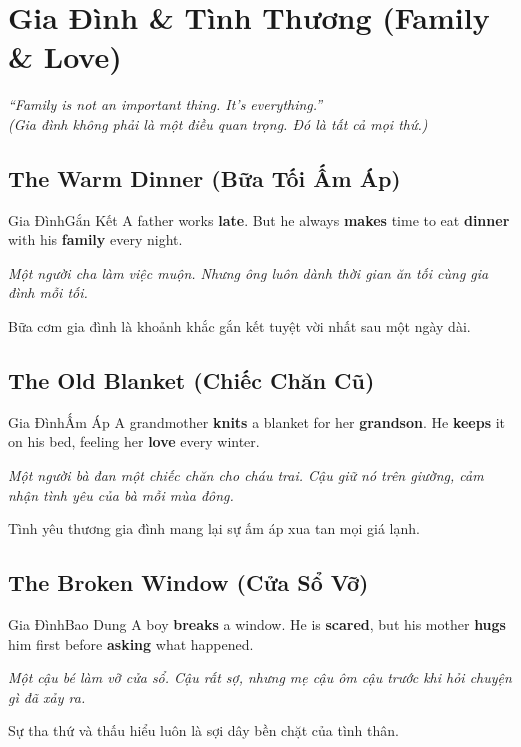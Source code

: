 \chapter{Gia Đình \& Tình Thương (Family \& Love)}

\begin{center}
  \textit{\color{truyenblue}``Family is not an important thing. It's everything.''}\\
  \textit{(Gia đình không phải là một điều quan trọng. Đó là tất cả mọi thứ.)}
\end{center}

\ngancach

\section{The Warm Dinner (Bữa Tối Ấm Áp)}
\begin{truyen}{Gia Đình}{Gắn Kết}
A father works \textbf{late}. But he always \textbf{makes} time to eat \textbf{dinner} with his \textbf{family} every night.

\textit{Một người cha làm việc muộn. Nhưng ông luôn dành thời gian ăn tối cùng gia đình mỗi tối.}

\begin{baihoc}
Bữa cơm gia đình là khoảnh khắc gắn kết tuyệt vời nhất sau một ngày dài.
\end{baihoc}
\end{truyen}

\section{The Old Blanket (Chiếc Chăn Cũ)}
\begin{truyen}{Gia Đình}{Ấm Áp}
A grandmother \textbf{knits} a blanket for her \textbf{grandson}. He \textbf{keeps} it on his bed, feeling her \textbf{love} every winter.

\textit{Một người bà đan một chiếc chăn cho cháu trai. Cậu giữ nó trên giường, cảm nhận tình yêu của bà mỗi mùa đông.}

\begin{baihoc}
Tình yêu thương gia đình mang lại sự ấm áp xua tan mọi giá lạnh.
\end{baihoc}
\end{truyen}

\section{The Broken Window (Cửa Sổ Vỡ)}
\begin{truyen}{Gia Đình}{Bao Dung}
A boy \textbf{breaks} a window. He is \textbf{scared}, but his mother \textbf{hugs} him first before \textbf{asking} what happened.

\textit{Một cậu bé làm vỡ cửa sổ. Cậu rất sợ, nhưng mẹ cậu ôm cậu trước khi hỏi chuyện gì đã xảy ra.}

\begin{baihoc}
Sự tha thứ và thấu hiểu luôn là sợi dây bền chặt của tình thân.
\end{baihoc}
\end{truyen}

